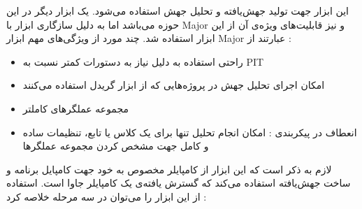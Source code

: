 این ابزار جهت تولید جهش‌یافته و تحلیل جهش استفاده می‌شود. یک ابزار دیگر در این حوزه 
 می‌باشد اما به دلیل سازگاری ابزار  با Major و نیز قابلیت‌های ویژه‌ی آن از این ابزار استفاده شد.
چند مورد از ویژگی‌های مهم ابزار Major عبارتند از :
\begin{itemize}

\item
 راحتی استفاده  به دلیل نیاز به دستورات کمتر نسبت به PIT
\item
امکان اجرای تحلیل جهش در پروژه‌هایی که از ابزار  گریدل استفاده می‌کنند
\item
 مجموعه عملگرهای کاملتر
\item
انعطاف در پیکربندی : امکان انجام تحلیل تنها برای یک کلاس یا تابع، تنظیمات ساده و کامل جهت مشخص کردن مجموعه عملگرها
\end{itemize}
لازم به ذکر است که این ابزار از کامپایلر‌ مخصوص به خود جهت کامپایل برنامه و ساخت جهش‌یافته استفاده می‌کند که گسترش یافته‌ی یک کامپایلر جاوا است. 
استفاده از این ابزار را می‌توان در سه مرحله خلاصه کرد :
